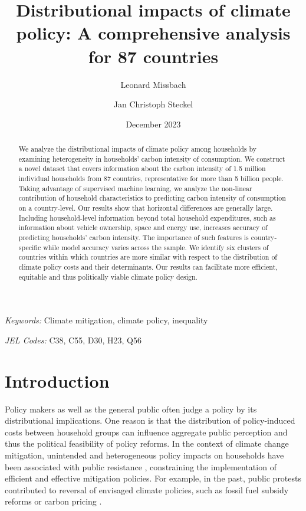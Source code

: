 \documentclass[12pt, a4paper]{article}
\title{Distributional impacts of climate policy: A comprehensive analysis for 87 countries}
\author[1,2,*]{Leonard Missbach}
\author[1,3]{Jan Christoph Steckel}
\affil[1]{\small Mercator Research Institute on Global Commons and Climate Change, Berlin, Germany}
\affil[2]{\small Technical University of Berlin, Berlin, Germany}
\affil[3]{\small Brandenburg University of Technology Cottbus Senftenberg, Cottbus, Germany}
\affil[*]{\normalsize Corresponding author: \href{mailto:missbach@mcc-berlin.net}{missbach@mcc-berlin.net}}
\date{December 2023}
\begin{document}
\maketitle
\begin{abstract}
  We analyze the distributional impacts of climate policy among households by examining heterogeneity in households' carbon intensity of consumption. We construct a novel dataset that covers information about the carbon intensity of 1.5 million individual households from 87 countries, representative for more than 5 billion people. Taking advantage of supervised machine learning, we analyze the non-linear contribution of household characteristics to predicting carbon intensity of consumption on a country-level.
   Our results show that horizontal differences are generally large. Including household-level information beyond total household expenditures, such as information about vehicle ownership, space and energy use, increases accuracy of predicting households' carbon intensity. The importance of such features is country-specific while model accuracy varies across the sample. We identify six clusters of countries within which countries are more similar with respect to the distribution of climate policy costs and their determinants. Our results can facilitate more efficient, equitable and thus politically viable climate policy design.   
\end{abstract}

\smallskip

\noindent \small \textit{Keywords:} Climate mitigation, climate policy, inequality

\noindent \small \textit{JEL Codes:} C38, C55, D30, H23, Q56

\thispagestyle{empty}
\clearpage
\setcounter{page}{1}

\normalsize

\section{Introduction} \label{sec:introduction}

Policy makers as well as the general public often judge a policy by its distributional implications. One reason is that the distribution of policy-induced costs between household groups can influence aggregate public perception and thus the political feasibility of policy reforms. In the context of climate change mitigation, unintended and heterogeneous policy impacts on households have been associated with public resistance \autocite{MaestreAndres.2019,Dechezlepretre.2022}, constraining the implementation of efficient and effective mitigation policies. For example, in the past, public protests contributed to reversal of envisaged climate policies, such as fossil fuel subsidy reforms \autocite{Clements.2013} or carbon pricing \autocite{Douenne.2020c}.
\end{document}
